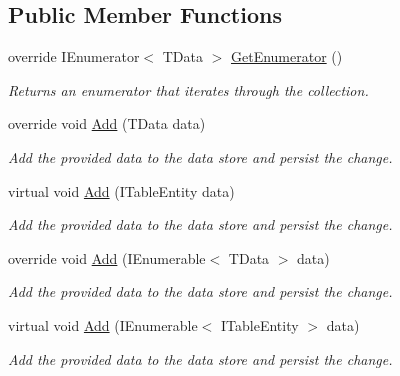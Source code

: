 \subsection*{Public Member Functions}
\begin{DoxyCompactItemize}
\item 
override I\+Enumerator$<$ T\+Data $>$ \hyperlink{classCqrs_1_1Azure_1_1BlobStorage_1_1TableStorageStore_ac3e684b894e739f8936e537806952c49_ac3e684b894e739f8936e537806952c49}{Get\+Enumerator} ()
\begin{DoxyCompactList}\small\item\em Returns an enumerator that iterates through the collection. \end{DoxyCompactList}\item 
override void \hyperlink{classCqrs_1_1Azure_1_1BlobStorage_1_1TableStorageStore_ad9becfb4b149c645450deba342696e54_ad9becfb4b149c645450deba342696e54}{Add} (T\+Data data)
\begin{DoxyCompactList}\small\item\em Add the provided {\itshape data}  to the data store and persist the change. \end{DoxyCompactList}\item 
virtual void \hyperlink{classCqrs_1_1Azure_1_1BlobStorage_1_1TableStorageStore_aa8e6b41c32dd8f81d5ff852693e7979d_aa8e6b41c32dd8f81d5ff852693e7979d}{Add} (I\+Table\+Entity data)
\begin{DoxyCompactList}\small\item\em Add the provided {\itshape data}  to the data store and persist the change. \end{DoxyCompactList}\item 
override void \hyperlink{classCqrs_1_1Azure_1_1BlobStorage_1_1TableStorageStore_a2b10c02a19150d5a68e6dcb4810ea8a1_a2b10c02a19150d5a68e6dcb4810ea8a1}{Add} (I\+Enumerable$<$ T\+Data $>$ data)
\begin{DoxyCompactList}\small\item\em Add the provided {\itshape data}  to the data store and persist the change. \end{DoxyCompactList}\item 
virtual void \hyperlink{classCqrs_1_1Azure_1_1BlobStorage_1_1TableStorageStore_a120c6fbb947cf4d37f60335df0182008_a120c6fbb947cf4d37f60335df0182008}{Add} (I\+Enumerable$<$ I\+Table\+Entity $>$ data)
\begin{DoxyCompactList}\small\item\em Add the provided {\itshape data}  to the data store and persist the change. \end{DoxyCompactList}\item 

\end{DoxyCompactItemize}
